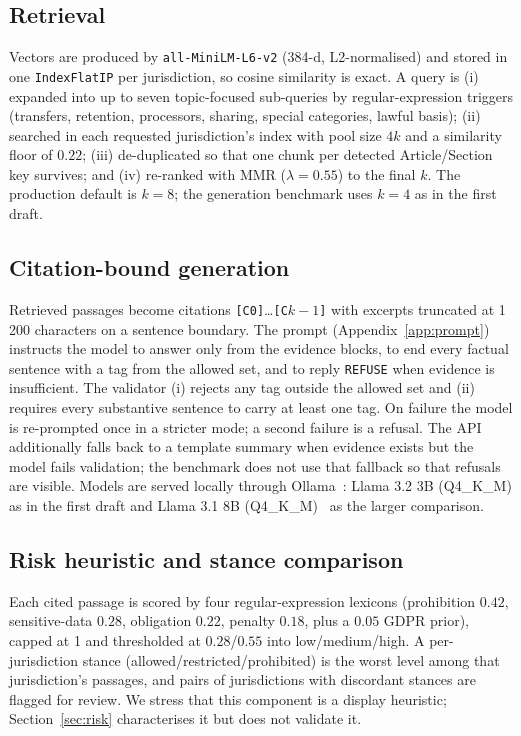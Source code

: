 \documentclass[conference]{IEEEtran}
\begin{document}
\begin{table}[t]
\centering
\caption{Indexed corpus. ``Heading field wrong'' is the share of chunks whose parser heading disagrees with the statutory unit the chunk is actually cut from (Section~\ref{sec:benchmark}).}
\label{tab:corpus}
\scriptsize
\setlength{\tabcolsep}{3pt}
\resizebox{\columnwidth}{!}{}
\end{table}

\subsection{Retrieval}
Vectors are produced by \texttt{all-MiniLM-L6-v2} (384-d, L2-normalised) and stored in one \texttt{IndexFlatIP} per jurisdiction, so cosine similarity is exact. A query is (i) expanded into up to seven topic-focused sub-queries by regular-expression triggers (transfers, retention, processors, sharing, special categories, lawful basis); (ii) searched in each requested jurisdiction's index with pool size $4k$ and a similarity floor of $0.22$; (iii) de-duplicated so that one chunk per detected Article/Section key survives; and (iv) re-ranked with MMR ($\lambda=0.55$) to the final $k$. The production default is $k=8$; the generation benchmark uses $k=4$ as in the first draft.

\subsection{Citation-bound generation}
Retrieved passages become citations \texttt{[C0]}\ldots\texttt{[C$k{-}1$]} with excerpts truncated at 1\,200 characters on a sentence boundary. The prompt (Appendix~\ref{app:prompt}) instructs the model to answer only from the evidence blocks, to end every factual sentence with a tag from the allowed set, and to reply \texttt{REFUSE} when evidence is insufficient. The validator (i) rejects any tag outside the allowed set and (ii) requires every substantive sentence to carry at least one tag. On failure the model is re-prompted once in a stricter mode; a second failure is a refusal. The API additionally falls back to a template summary when evidence exists but the model fails validation; the benchmark does not use that fallback so that refusals are visible. Models are served locally through Ollama~\cite{ollama}: Llama 3.2 3B (Q4\_K\_M) as in the first draft and Llama 3.1 8B (Q4\_K\_M)~\cite{dubey2024llama3} as the larger comparison.

\subsection{Risk heuristic and stance comparison}
Each cited passage is scored by four regular-expression lexicons (prohibition $0.42$, sensitive-data $0.28$, obligation $0.22$, penalty $0.18$, plus a $0.05$ GDPR prior), capped at 1 and thresholded at $0.28$/$0.55$ into low/medium/high. A per-jurisdiction stance (allowed/restricted/prohibited) is the worst level among that jurisdiction's passages, and pairs of jurisdictions with discordant stances are flagged for review. We stress that this component is a display heuristic; Section~\ref{sec:risk} characterises it but does not validate it.
\end{document}
